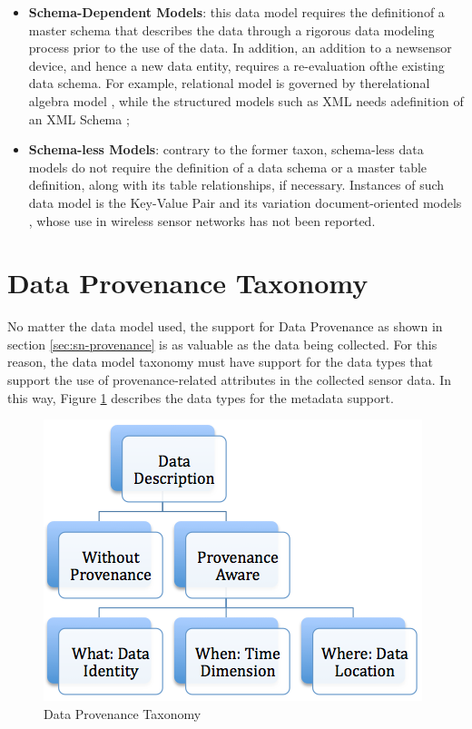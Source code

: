 \begin{itemize}
  \item \textbf{Schema-Dependent Models}: this data model requires the
  definitionof a master schema that describes the data through a rigorous data
  modeling process prior to the use of the data. In addition, an addition to a
  newsensor device, and hence a new data entity, requires a re-evaluation ofthe
  existing data schema. For example, relational model is governed by
  therelational algebra model \cite{relational-model}, while the structured
  models such as XML \cite{xml} needs adefinition of an XML Schema
  \cite{xml-schema};
  \item \textbf{Schema-less Models}: contrary to the former taxon, schema-less
  data models do not require the definition of a data schema or a master table
  definition, along with its table relationships, if necessary. Instances of
  such data model is the Key-Value Pair \cite{db-kvp} and its variation
  document-oriented models \cite{db-is-rdbs-dommed}, whose use in wireless
  sensor networks has not been reported.
\end{itemize}

\section{Data Provenance Taxonomy}

No matter the data model used, the support for Data Provenance as shown in
section \ref{sec:sn-provenance} is as valuable as the data being collected.
For this reason, the data model taxonomy must have support for the data types
that support the use of provenance-related attributes in the collected sensor
data. In this way, Figure \ref{fig:taxonomy-data-provenance} describes the
data types for the metadata support.

\begin{figure}[h]
  \centering
  \includegraphics{../diagrams/taxonomy-data-provenance}
  \caption{Data Provenance Taxonomy}
  \label{fig:taxonomy-data-provenance}
\end{figure}

